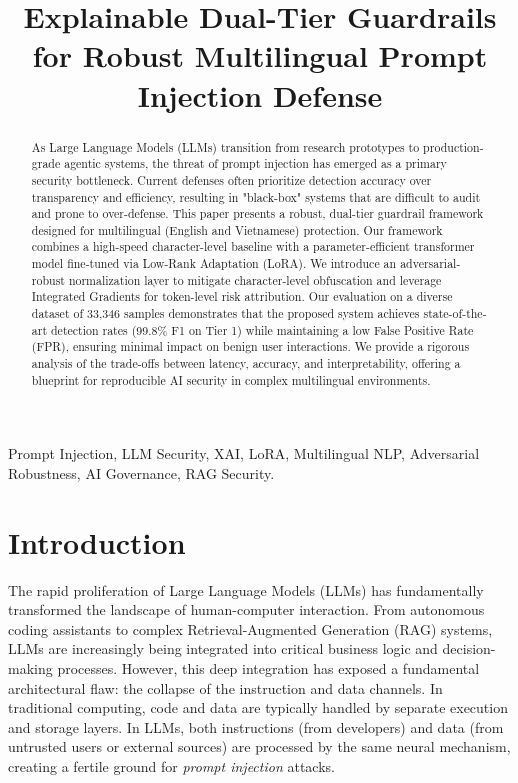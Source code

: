 \documentclass[10pt,conference]{IEEEtran}
\begin{document}
\title{Explainable Dual-Tier Guardrails for Robust Multilingual Prompt Injection Defense}

\author{
}

\maketitle

\begin{abstract}
As Large Language Models (LLMs) transition from research prototypes to production-grade agentic systems, the threat of prompt injection has emerged as a primary security bottleneck. Current defenses often prioritize detection accuracy over transparency and efficiency, resulting in "black-box" systems that are difficult to audit and prone to over-defense. This paper presents a robust, dual-tier guardrail framework designed for multilingual (English and Vietnamese) protection. Our framework combines a high-speed character-level baseline with a parameter-efficient transformer model fine-tuned via Low-Rank Adaptation (LoRA). We introduce an adversarial-robust normalization layer to mitigate character-level obfuscation and leverage Integrated Gradients for token-level risk attribution. Our evaluation on a diverse dataset of 33,346 samples demonstrates that the proposed system achieves state-of-the-art detection rates (99.8\% F1 on Tier 1) while maintaining a low False Positive Rate (FPR), ensuring minimal impact on benign user interactions. We provide a rigorous analysis of the trade-offs between latency, accuracy, and interpretability, offering a blueprint for reproducible AI security in complex multilingual environments.
\end{abstract}

\begin{IEEEkeywords}
Prompt Injection, LLM Security, XAI, LoRA, Multilingual NLP, Adversarial Robustness, AI Governance, RAG Security.
\end{IEEEkeywords}

\section{Introduction}
The rapid proliferation of Large Language Models (LLMs) has fundamentally transformed the landscape of human-computer interaction. From autonomous coding assistants to complex Retrieval-Augmented Generation (RAG) systems, LLMs are increasingly being integrated into critical business logic and decision-making processes. However, this deep integration has exposed a fundamental architectural flaw: the collapse of the instruction and data channels. In traditional computing, code and data are typically handled by separate execution and storage layers. In LLMs, both instructions (from developers) and data (from untrusted users or external sources) are processed by the same neural mechanism, creating a fertile ground for \textit{prompt injection} attacks.
\end{document}
